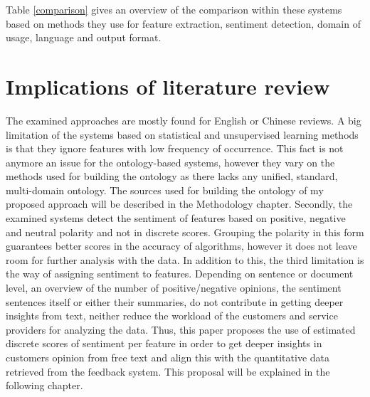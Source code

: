 Table \ref{comparison} gives an overview of the comparison within these systems based on methods they use for feature extraction, sentiment detection, domain of usage, language and output format.

\section{Implications of literature review}
The examined approaches are mostly found for English or Chinese reviews. A big limitation of the systems based on statistical and unsupervised learning methods is that they ignore features with low frequency of occurrence. This fact is not anymore an issue for the ontology-based systems, however they vary on the methods used for building the ontology as there lacks any unified, standard, multi-domain ontology. The sources used for building the ontology of my proposed approach will be described in the Methodology chapter.
Secondly, the examined systems detect the sentiment of features based on positive, negative and neutral polarity and not in discrete scores. Grouping the polarity in this form guarantees better scores in the accuracy of algorithms, however it does not leave room for further analysis with the data.
In addition to this, the third limitation is the way of assigning sentiment to features. Depending on sentence or document level, an overview of the number of positive/negative opinions, the sentiment sentences itself or either their summaries, do not contribute in getting deeper insights from text, neither reduce the workload of the customers and service providers for analyzing the data.
Thus, this paper proposes the use of estimated discrete scores of sentiment per feature in order to get deeper insights in customers opinion from free text and align this with the quantitative data retrieved from the feedback system. This proposal will be explained in the following chapter.
